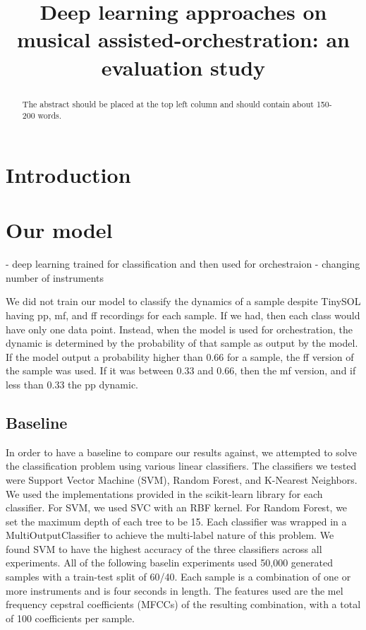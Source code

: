 \documentclass{article}
\title{Deep learning approaches on musical assisted-orchestration: an evaluation study}
\begin{document}
%
\maketitle
%
\begin{abstract}
The abstract should be placed at the top left column and should contain about 150-200 words.
\end{abstract}
%
\section{Introduction}\label{sec:introduction}

\section{Our model}
- deep learning trained for classification and then used for orchestraion
- changing number of instruments

We did not train our model to classify the dynamics of a sample despite TinySOL having pp, mf, and ff recordings for each sample. If we had, then each class would have only one data point. Instead, when the model is used for orchestration, the dynamic is determined by the probability of that sample as output by the model. If the model output a probability higher than $0.66$ for a sample, the ff version of the sample was used. If it was between $0.33$ and $0.66$, then the mf version, and if less than $0.33$ the pp dynamic.

\subsection{Baseline}
In order to have a baseline to compare our results against, we attempted to solve the classification problem using various linear classifiers. The classifiers we tested were Support Vector Machine (SVM), Random Forest, and K-Nearest Neighbors. We used the implementations provided in the scikit-learn library for each classifier. For SVM, we used SVC with an RBF kernel. For Random Forest, we set the maximum depth of each tree to be 15. Each classifier was wrapped in a MultiOutputClassifier to achieve the multi-label nature of this problem. We found SVM to have the highest accuracy of the three classifiers across all experiments. All of the following baselin experiments used 50,000 generated samples with a train-test split of 60/40. Each sample is a combination of one or more instruments and is four seconds in length. The features used are the mel frequency cepstral coefficients (MFCCs) of the resulting combination, with a total of 100 coefficients per sample.
\end{document}
